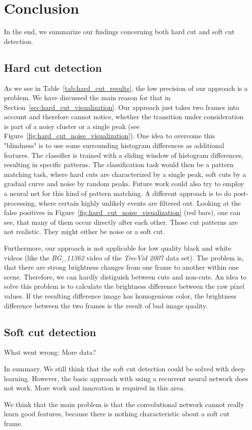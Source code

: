 \section{Conclusion}
\label{sec:conclusion}
In the end, we summarize our findings concerning both hard cut and soft cut detection.

\subsection{Hard cut detection}
\label{sec:conclusion_hard_cut}

As we see in Table~\ref{tab:hard_cut_results}, the low precision of our approach is a problem.
We have discussed the main reason for that in Section~\ref{sec:hard_cut_visualization}.
Our approach just takes two frames into account and therefore cannot notice, whether the transition under consideration is part of a noisy cluster or a single peak (see Figure~\ref{fig:hard_cut_noise_visualization}).
One idea to overcome this "blindness" is to use some surrounding histogram differences as additional features.
The classifier is trained with a sliding window of histogram differences, resulting in specific patterns.
The classification task would then be a pattern matching task, where hard cuts are characterized by a single peak, soft cuts by a gradual curve and noise by random peaks.
Future work could also try to employ a neural net for this kind of pattern matching.
A different approach is to do post-processing, where certain highly unlikely events are filtered out.
Looking at the false positives in Figure~\ref{fig:hard_cut_noise_visualization} (red bars), one can see, that many of them occur directly after each other.
Those cut patterns are not realistic.
They might either be noise or a soft cut.

Furthermore, our approach is not applicable for low quality black and white videos (like the \emph{BG\_11362} video of the \emph{TrecVid 2007} data set).
The problem is, that there are strong brightness changes from one frame to another within one scene.
Therefore, we can hardly distiguish between cuts and non-cuts.
An idea to solve this problem is to calculate the brightness difference between the raw pixel values.
If the resulting difference image has homogenious color, the brightness difference between the two frames is the result of bad image quality.


\subsection{Soft cut detection}
\label{sec:conclusion_hard_cut}

What went wrong:
More data?

In summary.
We still think that the soft cut detection could be solved with deep learning.
However, the basic approach with using a recurrent neural network does not work.
More work and innovation is required in this area.

We think that the main problem is that the convolutional network cannot really learn good features, because there is nothing characteristic about a soft cut frame.
